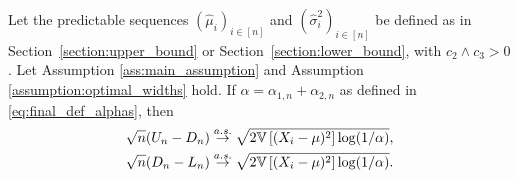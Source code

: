 \begin{corollary} [Sharpness] \label{corollary:sharpness}
Let the predictable sequences $(\widehat\mu_i)_{i \in [n]}$ and $(\widehat\sigma_i^2)_{i \in [n]}$ be defined as in Section~\ref{section:upper_bound} or Section~\ref{section:lower_bound}, with $c_2 \wedge c_3 > 0$. Let Assumption \ref{ass:main_assumption} and Assumption \ref{assumption:optimal_widths} hold. If $\alpha = \alpha_{1, n} + \alpha_{2, n}$ as defined in \eqref{eq:final_def_alphas}, then
\begin{align*}
    &\sqrt{n} (U_n - D_n) \stackrel{a.s.}{\to} \sqrt{2 \mathbb{V} \left[ (X_i-\mu)^2\right] \log (1 / \alpha)},
    \\&\sqrt{n} (D_n - L_n) \stackrel{a.s.}{\to} \sqrt{2 \mathbb{V} \left[ (X_i-\mu)^2\right] \log (1 / \alpha)}.
\end{align*}
\end{corollary}














